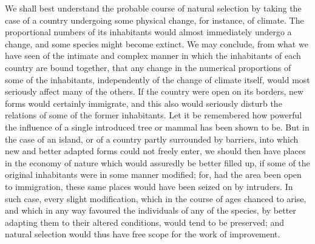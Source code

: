 We shall best understand the probable course of natural selection by taking the case of a country undergoing some physical change, for instance, of climate. The proportional numbers of its inhabitants would almost immediately undergo a change, and some species might become extinct. We may conclude, from what we have seen of the intimate and complex manner in which the inhabitants of each country are bound together, that any change in the numerical proportions of some of the inhabitants, independently of the change of climate itself, would most seriously affect many of the others. If the country were open on its borders, new forms would certainly immigrate, and this also would seriously disturb the relations of some of the former inhabitants. Let it be remembered how powerful the influence of a single introduced tree or mammal has been shown to be. But in the case of an island, or of a country partly surrounded by barriers, into which new and better adapted forms could not freely enter, we should then have places in the economy of nature which would assuredly be better filled up, if some of the original inhabitants were in some manner modified; for, had the area been open to immigration, these same places would have been seized on by intruders. In such case, every slight modification, which in the course of ages chanced to arise, and which in any way favoured the individuals of any of the species, by better adapting them to their altered conditions, would tend to be preserved; and natural selection would thus have free scope for the work of improvement.
